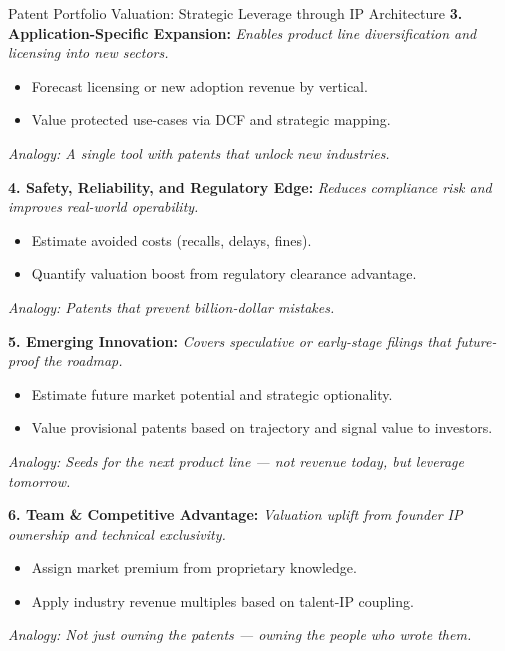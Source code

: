 \begin{TechnicalSidebar}{Patent Portfolio Valuation: Strategic Leverage through IP Architecture}
    \textbf{3. Application-Specific Expansion:}  
    \textit{Enables product line diversification and licensing into new sectors.}

    \medskip
    \begin{itemize}
      \item Forecast licensing or new adoption revenue by vertical.
      \item Value protected use-cases via DCF and strategic mapping.
    \end{itemize}

    \medskip

    \textit{Analogy: A single tool with patents that unlock new industries.}
    
    \medskip
    
    \textbf{4. Safety, Reliability, and Regulatory Edge:}  
    \textit{Reduces compliance risk and improves real-world operability.}

    \medskip
    \begin{itemize}
      \item Estimate avoided costs (recalls, delays, fines).
      \item Quantify valuation boost from regulatory clearance advantage.
    \end{itemize}

    \medskip

    \textit{Analogy: Patents that prevent billion-dollar mistakes.}
    
    \medskip
    
    \textbf{5. Emerging Innovation:}  
    \textit{Covers speculative or early-stage filings that future-proof the roadmap.}

    \medskip
    \begin{itemize}
      \item Estimate future market potential and strategic optionality.
      \item Value provisional patents based on trajectory and signal value to investors.
    \end{itemize}

    \medskip

    \textit{Analogy: Seeds for the next product line — not revenue today, but leverage tomorrow.}
    
    \medskip
    
    \textbf{6. Team \& Competitive Advantage:}  
    \textit{Valuation uplift from founder IP ownership and technical exclusivity.}

    \medskip
    \begin{itemize}
      \item Assign market premium from proprietary knowledge.
      \item Apply industry revenue multiples based on talent-IP coupling.
    \end{itemize}
    \textit{Analogy: Not just owning the patents — owning the people who wrote them.}


\end{TechnicalSidebar}
